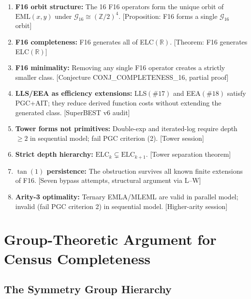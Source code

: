 \documentclass[11pt]{article}
\begin{document}
\begin{enumerate}
  \item \textbf{F16 orbit structure:} The 16 F16 operators form the unique orbit
        of $\mathrm{EML}(x,y)$ under $\mathcal{G}_{16} \cong (\mathbb{Z}/2)^4$.
        [Proposition: F16 forms a single $\mathcal{G}_{16}$ orbit]

  \item \textbf{F16 completeness:} F16 generates all of ELC$(\mathbb{R})$.
        [Theorem: F16 generates ELC$(\mathbb{R})$]

  \item \textbf{F16 minimality:} Removing any single F16 operator creates
        a strictly smaller class.
        [Conjecture CONJ\_COMPLETENESS\_16, partial proof]

  \item \textbf{LLS/EEA as efficiency extensions:}
        LLS$(\#17)$ and EEA$(\#18)$ satisfy PGC+AIT; they reduce derived function costs
        without extending the generated class.
        [SuperBEST v6 audit]

  \item \textbf{Tower forms not primitives:} Double-exp and iterated-log require
        depth $\geq 2$ in sequential model; fail PGC criterion (2).
        [Tower session]

  \item \textbf{Strict depth hierarchy:} $\mathrm{ELC}_k \subsetneq \mathrm{ELC}_{k+1}$.
        [Tower separation theorem]

  \item \textbf{$\tan(1)$ persistence:} The obstruction survives all known
        finite extensions of F16.
        [Seven bypass attempts, structural argument via L--W]

  \item \textbf{Arity-3 optimality:} Ternary EMLA/MLEML are valid in parallel model;
        invalid (fail PGC criterion 2) in sequential model.
        [Higher-arity session]
\end{enumerate}

\section{Group-Theoretic Argument for Census Completeness}
\label{sec:grouptheory}

\subsection{The Symmetry Group Hierarchy}
\end{document}
